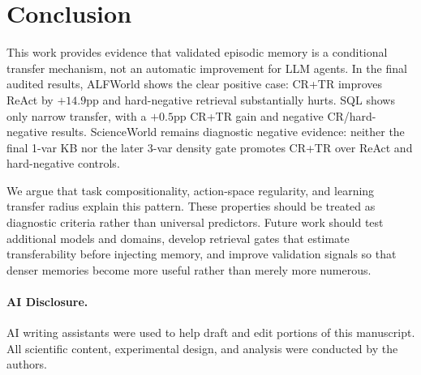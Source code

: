 \section{Conclusion}
\label{sec:conclusion}

This work provides evidence that validated episodic memory is a conditional transfer mechanism, not an automatic improvement for LLM agents.
In the final audited results, ALFWorld shows the clear positive case: CR+TR improves ReAct by $+14.9$pp and hard-negative retrieval substantially hurts.
SQL shows only narrow transfer, with a $+0.5$pp CR+TR gain and negative CR/hard-negative results.
ScienceWorld remains diagnostic negative evidence: neither the final 1-var KB nor the later 3-var density gate promotes CR+TR over ReAct and hard-negative controls.

We argue that task compositionality, action-space regularity, and learning transfer radius explain this pattern.
These properties should be treated as diagnostic criteria rather than universal predictors.
Future work should test additional models and domains, develop retrieval gates that estimate transferability before injecting memory, and improve validation signals so that denser memories become more useful rather than merely more numerous.

\paragraph{AI Disclosure.}
AI writing assistants were used to help draft and edit portions of this manuscript. All scientific content, experimental design, and analysis were conducted by the authors.
